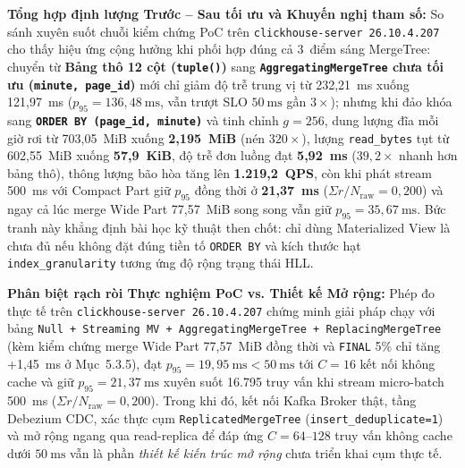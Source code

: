 \documentclass[13pt,a4paper]{report}
\begin{document}
\noindent\textbf{Tổng hợp định lượng Trước -- Sau tối ưu và Khuyến nghị tham số:}
So sánh xuyên suốt chuỗi kiểm chứng PoC trên \texttt{clickhouse-server 26.10.4.207} cho thấy hiệu ứng cộng hưởng khi phối hợp đúng cả 3~điểm sáng MergeTree: chuyển từ \textbf{Bảng thô 12 cột (\texttt{tuple()})} sang \textbf{\texttt{AggregatingMergeTree} chưa tối ưu (\texttt{minute, page\_\allowbreak{}id})} mới chỉ giảm độ trễ trung vị từ 232,21~ms xuống 121,97~ms ($p_{95} = 136{,}48~\text{ms}$, vẫn trượt SLO $50~\text{ms}$ gần $3{\times}$); nhưng khi đảo khóa sang \textbf{\texttt{ORDER BY (page\_\allowbreak{}id, minute)}} và tinh chỉnh \textbf{$g = 256$}, dung lượng đĩa mỗi giờ rơi từ 703,05~MiB xuống \textbf{2,195~MiB} (nén $320{\times}$), lượng \texttt{read\_\allowbreak{}bytes} tụt từ 602,55~MiB xuống \textbf{57,9~KiB}, độ trễ đơn luồng đạt \textbf{5,92~ms} ($39{,}2{\times}$ nhanh hơn bảng thô), thông lượng bão hòa tăng lên \textbf{1.219,2~QPS}, còn khi phát stream 500~ms với Compact Part giữ $p_{95}$ đồng thời ở \textbf{21,37~ms} ($\Sigma r / N_{\text{raw}} = 0{,}200$) và ngay cả lúc merge Wide Part 77,57~MiB song song vẫn giữ $p_{95} = 35{,}67~\text{ms}$. Bức tranh này khẳng định bài học kỹ thuật then chốt: chỉ dùng Materialized View là chưa đủ nếu không đặt đúng tiền tố \texttt{ORDER BY} và kích thước hạt \texttt{index\_\allowbreak{}granularity} tương ứng độ rộng trạng thái HLL.

\noindent\textbf{Phân biệt rạch ròi Thực nghiệm PoC vs. Thiết kế Mở rộng:} Phép đo thực tế trên \texttt{clickhouse-server 26.10.4.207} chứng minh giải pháp chạy với bảng \texttt{Null + Streaming MV + AggregatingMergeTree + ReplacingMergeTree} (kèm kiểm chứng merge Wide Part 77,57~MiB đồng thời và \texttt{FINAL} 5\% chỉ tăng +1,45~ms ở Mục~5.3.5), đạt $p_{95} = 19{,}95~\text{ms} < 50~\text{ms}$ tới $C = 16$ kết nối không cache và giữ $p_{95} = 21{,}37~\text{ms}$ xuyên suốt 16.795 truy vấn khi stream micro-batch 500~ms ($\Sigma r / N_{\text{raw}} = 0{,}200$). Trong khi đó, kết nối Kafka Broker thật, tầng Debezium CDC, xác thực cụm \texttt{ReplicatedMergeTree} (\texttt{insert\_\allowbreak{}deduplicate=1}) và mở rộng ngang qua read-replica để đáp ứng $C = 64\text{--}128$ truy vấn không cache dưới $50~\text{ms}$ vẫn là phần \textit{thiết kế kiến trúc mở rộng} chưa triển khai cụm thực tế.

\end{document}

